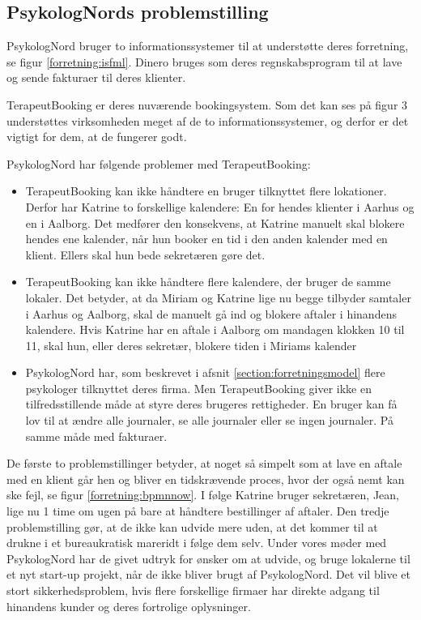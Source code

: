 \subsection{PsykologNords problemstilling}
\label{section:problemstilling}

PsykologNord bruger to informationssystemer til at understøtte deres forretning, se figur \ref{forretning:isfml}.
Dinero bruges som deres regnskabsprogram til at lave og sende fakturaer til deres klienter.

TerapeutBooking er deres nuværende bookingsystem.
Som det kan ses på figur 3 understøttes virksomheden meget af de to informationssystemer, og derfor er det vigtigt for dem, at de fungerer godt.

PsykologNord har følgende problemer med TerapeutBooking:

\begin{itemize}
    \item TerapeutBooking kan ikke håndtere en bruger tilknyttet flere lokationer.
    Derfor har Katrine to forskellige kalendere: En for hendes klienter i Aarhus og en i Aalborg.
    Det medfører den konsekvens, at Katrine manuelt skal blokere hendes ene kalender, når hun booker en tid i den anden kalender med en klient. Ellers skal hun bede sekretæren gøre det.
    
    \item TerapeutBooking kan ikke håndtere flere kalendere, der bruger de samme lokaler.
    Det betyder, at da Miriam og Katrine lige nu begge tilbyder samtaler i Aarhus og Aalborg, skal de manuelt gå ind og blokere aftaler i hinandens kalendere.
    Hvis Katrine har en aftale i Aalborg om mandagen klokken 10 til 11, skal hun, eller deres sekretær, blokere tiden i Miriams kalender
    
   \item PsykologNord har, som beskrevet i afsnit \ref{section:forretningsmodel} flere psykologer tilknyttet deres firma.
   Men TerapeutBooking giver ikke en tilfredsstillende måde at styre deres brugeres rettigheder.
   En bruger kan få lov til at ændre alle journaler, se alle journaler eller se ingen journaler.
   På samme måde med fakturaer.
\end{itemize}

De første to problemstillinger betyder, at noget så simpelt som at lave en aftale med en klient går hen og bliver en tidskrævende proces, hvor der også nemt kan ske fejl, se figur \ref{forretning:bpmnnow}.
I følge Katrine bruger sekretæren, Jean, lige nu 1 time om ugen på bare at håndtere bestillinger af aftaler.
Den tredje problemstilling gør, at de ikke kan udvide mere uden, at det kommer til at drukne i et bureaukratisk mareridt i følge dem selv.
Under vores møder med PsykologNord har de givet udtryk for ønsker om at udvide, og bruge lokalerne til et nyt start-up projekt, når de ikke bliver brugt af PsykologNord.
Det vil blive et stort sikkerhedsproblem, hvis flere forskellige firmaer har direkte adgang til hinandens kunder og deres fortrolige oplysninger.



